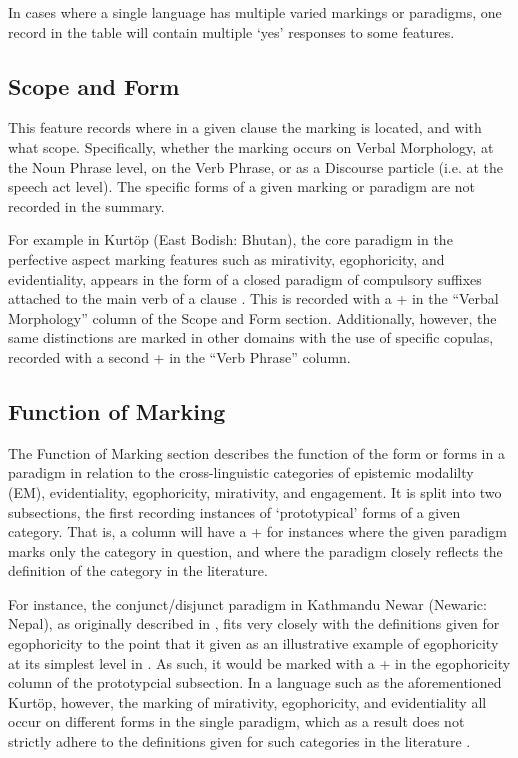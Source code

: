 In cases where a single language has multiple varied markings or paradigms, one record in the table will contain multiple `yes' responses to some features.

\subsection{Scope and Form}
This feature records where in a given clause the marking is located, and with what scope. Specifically, whether the marking occurs on Verbal Morphology, at the Noun Phrase level, on the Verb Phrase, or as a Discourse particle (i.e. at the speech act level). The specific forms of a given marking or paradigm are not recorded in the summary.

For example in Kurtöp (East Bodish: Bhutan), the core paradigm in the perfective aspect marking features such as mirativity, egophoricity, and evidentiality, appears in the form of a closed paradigm of compulsory suffixes attached to the main verb of a clause \cite{Hyslop2018}. This is recorded with a + in the ``Verbal Morphology'' column of the Scope and Form section. Additionally, however, the same distinctions are marked in other domains with the use of specific copulas, recorded with a second + in the ``Verb Phrase'' column.

\subsection{Function of Marking}
The Function of Marking section describes the function of the form or forms in a paradigm in relation to the cross-linguistic categories of epistemic modalilty (EM), evidentiality, egophoricity, mirativity, and engagement. It is split into two subsections, the first recording instances of `prototypical' forms of a given category. That is, a column will have a + for instances where the given paradigm marks only the category in question, and where the paradigm closely reflects the definition of the category in the literature.

For instance, the conjunct/disjunct paradigm in Kathmandu Newar (Newaric: Nepal), as originally described in , fits very closely with the definitions given for egophoricity to the point that it given as an illustrative example of egophoricity at its simplest level in . As such, it would be marked with a + in the egophoricity column of the prototypcial subsection. In a language such as the aforementioned Kurtöp, however, the marking of mirativity, egophoricity, and evidentiality all occur on different forms in the single paradigm, which as a result does not strictly adhere to the definitions given for such categories in the literature \cites{DeLancey2012}{EgoIntro}{Aikhenvald2018Intro}.

